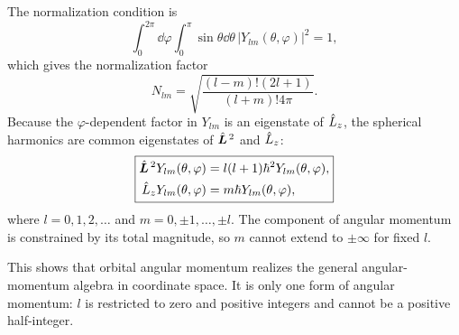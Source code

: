 The normalization condition is
\begin{equation}
\int_0^{2\pi}\!\dd\varphi\int_0^\pi\!\sin\theta\dd\theta\,
|Y_{lm}(\theta,\varphi)|^2=1,
\end{equation}
which gives the normalization factor
\begin{equation}
N_{lm}=\sqrt{\frac{(l-m)!(2l+1)}{(l+m)!4\pi}}.
\end{equation}
Because the $\varphi$-dependent factor in $Y_{lm}$ is an eigenstate of $\hat{L}_z$, the spherical harmonics are common eigenstates of $\hat{\bm{L}}^{\,2}$ and $\hat{L}_z$:
\begin{equation}
\boxed{\begin{aligned}
\hat{\bm{L}}^{\,2}Y_{lm}(\theta,\varphi)&=l(l+1)\hbar^2Y_{lm}(\theta,\varphi),\\
\hat{L}_zY_{lm}(\theta,\varphi)&=m\hbar Y_{lm}(\theta,\varphi),
\end{aligned}}
\end{equation}
where $l=0,1,2,\ldots$ and $m=0,\pm1,\ldots,\pm l$. The component of angular momentum is constrained by its total magnitude, so $m$ cannot extend to $\pm\infty$ for fixed $l$.

This shows that orbital angular momentum realizes the general angular-momentum algebra in coordinate space. It is only one form of angular momentum: $l$ is restricted to zero and positive integers and cannot be a positive half-integer.

